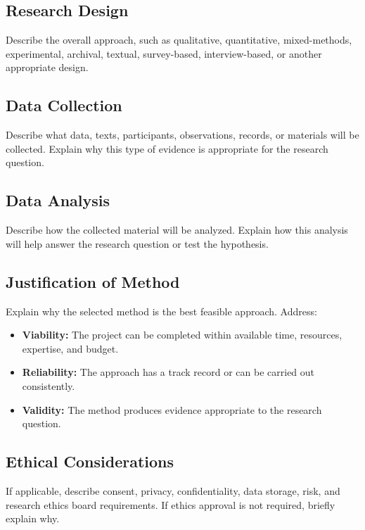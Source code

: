 \documentclass[12pt]{article}
\begin{document}
\subsection{Research Design}

Describe the overall approach, such as qualitative, quantitative, mixed-methods,
experimental, archival, textual, survey-based, interview-based, or another
appropriate design.

\subsection{Data Collection}

Describe what data, texts, participants, observations, records, or materials
will be collected. Explain why this type of evidence is appropriate for the
research question.

\subsection{Data Analysis}

Describe how the collected material will be analyzed. Explain how this analysis
will help answer the research question or test the hypothesis.

\subsection{Justification of Method}

Explain why the selected method is the best feasible approach. Address:

\begin{itemize}
  \item \textbf{Viability:} The project can be completed within available time,
  resources, expertise, and budget.
  \item \textbf{Reliability:} The approach has a track record or can be carried
  out consistently.
  \item \textbf{Validity:} The method produces evidence appropriate to the
  research question.
\end{itemize}

\subsection{Ethical Considerations}

If applicable, describe consent, privacy, confidentiality, data storage, risk,
and research ethics board requirements. If ethics approval is not required,
briefly explain why.
\end{document}
